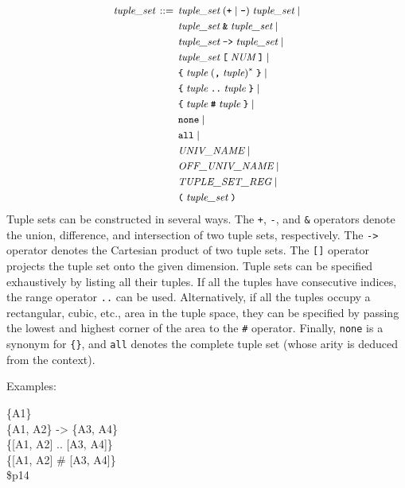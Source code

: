 \documentclass[a4paper,12pt]{article}
\begin{document}
$$\small\begin{aligned}
\textit{tuple\_set} \,::=\,{}
    & \textit{tuple\_set}\; (\verb|+| \mid \verb|-|)\; \textit{tuple\_set} \mid \\
    & \textit{tuple\_set}\; \verb|&|\; \textit{tuple\_set} \mid \\
    & \textit{tuple\_set}\; \verb|->|\; \textit{tuple\_set} \mid \\
    & \textit{tuple\_set}\; \verb|[|\; \textit{NUM}\; \verb|]| \mid \\
    & \verb|{|\; \textit{tuple}\; (\verb|,|\; \textit{tuple})^*\; \verb|}| \mid \\
    & \verb|{|\; \textit{tuple}\; \verb|..|\; \textit{tuple}\; \verb|}| \mid \\
    & \verb|{|\; \textit{tuple}\; \verb|#|\; \textit{tuple}\; \verb|}| \mid \\
    & \verb|none| \mid \\
    & \verb|all| \mid \\
    & \textit{UNIV\_NAME} \mid \\
    & \textit{OFF\_UNIV\_NAME} \mid \\
    & \textit{TUPLE\_SET\_REG} \mid \\
    & \verb|(|\; \textit{tuple\_set}\; \verb|)|
\end{aligned}$$
%
Tuple sets can be constructed in several ways. The \verb|+|, \verb|-|, and
\verb|&| operators denote the union, difference, and intersection of two tuple
sets, respectively. The \verb|->| operator denotes the Cartesian product of two
tuple sets. The \verb|[]| operator projects the tuple set onto the given
dimension. Tuple sets can be specified exhaustively by listing all their tuples.
If all the tuples have consecutive indices, the range operator \verb|..| can be
used. Alternatively, if all the tuples occupy a rectangular, cubic, etc., area
in the tuple space, they can be specified by passing the lowest and highest
corner of the area to the \verb|#| operator. Finally, \verb|none| is a synonym
for \verb|{}|, and \verb|all| denotes the complete tuple set (whose arity is
deduced from the context).

Examples:

\pre
\ttfamily\small
\{A1\} \\
\{A1, A2\} -> \{A3, A4\} \\
\{[A1, A2] {.}{.} [A3, A4]\} \\
\{[A1, A2] \# [A3, A4]\} \\
\$p14
\post
\end{document}
